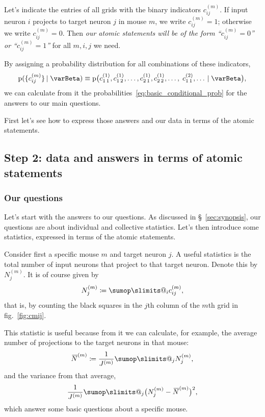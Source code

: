 \documentclass[\ifafour a4paper,12pt,\else a5paper,10pt,\fi%
onecolumn,oneside,article,%
british%
]{memoir}
\makeatletter
\theoremstyle{remark}
\theoremstyle{innote}
\def\sum{\DOTSI\sumop\slimits@}
\newcommand*{\defd}{\coloneqq}
\newcommand*{\pf}{\mathrm{p}}%
\renewcommand*{\|}[1][]{\nonscript\,#1\vert\nonscript\;\mathopen{}}
\newcommand*{\sect}{\S}%
\newcommand*{\fig}{fig.}%
\newcommand*{\widebar}[1]{{\mkern1.5mu\skew{2}\overline{\mkern-1.5mu#1\mkern-1.5mu}\mkern 1.5mu}}
\newcommand*{\yI}{\varBeta}
\newcommand*{\yNa}{\widebar{N}}
\newcommand*{\yJm}[1][m]{J^{(#1)}}
\newcommand*{\yNm}[1][m]{N^{(#1)}}
\newcommand*{\yNma}[1][m]{\yNa^{(#1)}}
\newcommand*{\ycm}[1][m]{c^{(#1)}}
\DeclarePairedDelimiter\tu{\{}{\}}
\makeatother
\begin{document}
Let's indicate the entries of all grids with the binary indicators
$\ycm_{ij}$. If input neuron $i$ projects to target neuron $j$ in mouse
$m$, we write $\ycm_{ij}=1$; otherwise we write $\ycm_{ij}=0$. Then
\emph{our atomic statements will be of the form \enquote{$\ycm_{ij}=0$} or
  \enquote{$\ycm_{ij}=1$}} for all $m,i,j$ we need.

By assigning  a probability distribution for all combinations of these indicators,
\begin{equation}
  \label{eq:guess_prob_c}
  \pf(\tu{\ycm_{ij}} \| \yI)
  \equiv
  \pf\bigl(
  \ycm[1]_{1\,1}, \ycm[1]_{1\,2}, \dotsc,
  \ycm[1]_{2\,1}, \ycm[1]_{2\,2}, \dotsc,\;
  \ycm[2]_{1\,1}, \dotsc
  \|  \yI\bigr),
\end{equation}
we can calculate from it the
probabilities~\eqref{eq:basic_conditional_prob} for the answers to our main
questions.

First let's see how to express those answers and our data in terms of the
atomic statements.

\subsection{Step 2: data and answers in terms of atomic statements}
\label{sec:data_as_atomic}

\subsubsection{Our questions}
\label{sec:atomic_questions}

Let's start with the answers to our questions. As discussed in
\sect~\ref{sec:synopsis}, our questions are about individual and collective
statistics. Let's then introduce some statistics, expressed in terms of the
atomic statements.

Consider first a specific mouse $m$ and target neuron $j$. A useful
statistics is the total number of input neurons that project to that target
neuron. Denote this by $\yNm_{j}$. It is of course given by
\begin{equation}
  \label{eq:def_Nj}
  \yNm_{j} \defd \sum_{i} \ycm_{ij},
\end{equation}
that is, by counting the black squares in the $j$th column of the $m$th
grid in \fig~\ref{fig:cmij}.

This statistic is useful because from it we can calculate, for example, the average
number of projections to the target neurons in that mouse:
\begin{equation}
\yNma \defd \frac{1}{\yJm}\sum_{j}\yNm_{j},\label{eq:aver_proj_m}
\end{equation}
and the variance from that average,
\begin{equation}
\frac{1}{\yJm}\sum_{j}\bigl(\yNm_{j}-\yNma\bigr)^{2},\label{eq:variance_proj_m}
\end{equation}
which answer some basic questions about a specific mouse.
\end{document}
